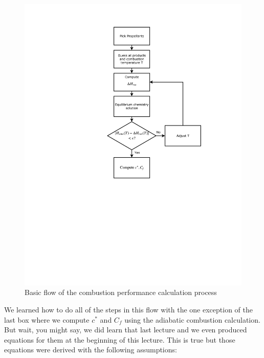 \documentclass[twocolumn]{memoir} %
\begin{document}
\begin{figure}
    \includegraphics[width=\columnwidth]{combustion_flow}
    \caption{Basic flow of the combustion performance calculation process}
\end{figure}
%
We learned how to do all of the steps in this flow with the one exception of the last box where we compute
$c^*$ and $C_f$ using the adiabatic combustion calculation.  But wait, you might say, we did learn that last
lecture and we even produced equations for them at the beginning of this lecture.  This is true but
those equations were derived with the following assumptions:
\end{document}
